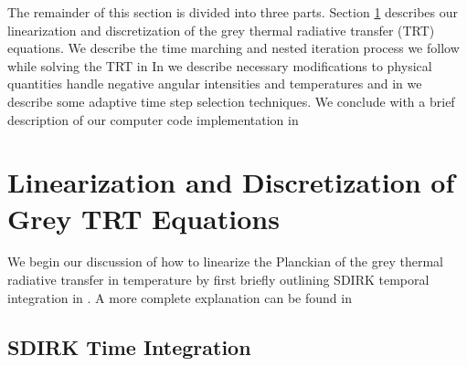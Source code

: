 The remainder of this section is divided into three parts.  Section \ref{sec:chap6_linearization} describes our linearization and discretization of the grey thermal radiative transfer (TRT) equations. 
We describe the time marching and nested iteration process we follow while solving the TRT in 
In  we describe necessary modifications to physical quantities handle negative angular intensities and temperatures and in
 we describe some adaptive time step selection techniques.
We conclude with a brief description of our computer code implementation in 

\section{Linearization and Discretization of Grey TRT Equations}
\label{sec:chap6_linearization}
We begin our discussion of how to linearize the Planckian of the grey thermal radiative transfer in temperature by first briefly outlining SDIRK temporal integration in .
A more complete explanation can be found in \cite{alexander}

\subsection{SDIRK Time Integration}
\label{sec:sdirk_explained}

